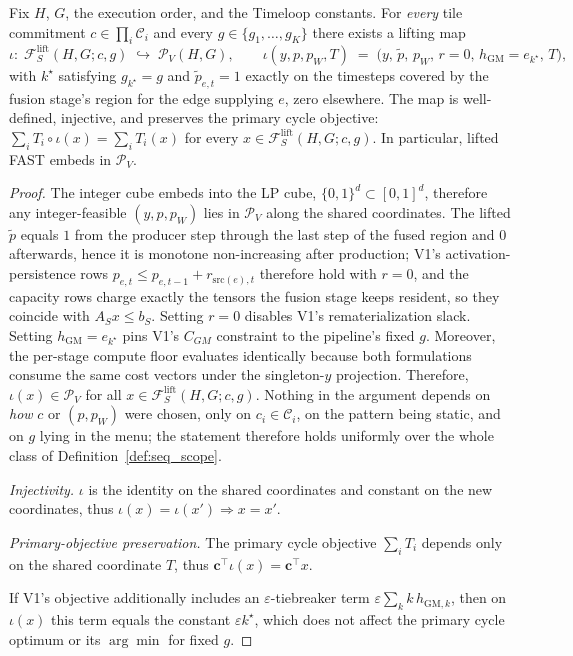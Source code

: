 \begin{theorem}
\label{thm:containment}
Fix $H$, $G$, the execution order, and the Timeloop constants. For
\emph{every} tile commitment $c \in \prod_i \mathcal{C}_i$ and every
$g \in \{g_1,\ldots,g_K\}$ there exists a lifting map
$$
\iota:\; \mathcal{F}_S^{\mathrm{lift}}(H,G;c,g) \;\hookrightarrow\; \mathcal{P}_V(H,G),\qquad
\iota(y,p,p_W,T) \;=\; \big(y,\,\tilde{p},\,p_W,\,r{=}0,\,h_{\mathrm{GM}}{=}e_{k^\star},\,T\big),
$$
with $k^\star$ satisfying $g_{k^\star}{=}g$ and $\tilde{p}_{e,t}{=}1$ exactly on
the timesteps covered by the fusion stage's region for the edge supplying $e$,
zero elsewhere. The map is well-defined, injective, and preserves the primary
cycle objective: $\sum_i T_i \circ\iota(x) = \sum_i T_i(x)$ for every
$x \in \mathcal{F}_S^{\mathrm{lift}}(H,G;c,g)$. In particular, lifted FAST
embeds in $\mathcal{P}_V$.
\end{theorem}

\begin{proof}
The integer cube embeds into the LP cube, $\{0,1\}^{d} \subset [0,1]^{d}$,
therefore any integer-feasible $(y,p,p_W)$ lies in $\mathcal{P}_V$ along the
shared coordinates.
The lifted $\tilde{p}$ equals $1$ from the producer step through the last step
of the fused region and $0$ afterwards, hence it is monotone non-increasing
after production; V1's activation-persistence rows
$p_{e,t} \le p_{e,t-1} + r_{\mathrm{src}(e),t}$ therefore hold with $r{=}0$,
and the capacity rows charge exactly the tensors the fusion stage keeps
resident, so they coincide with $A_S x \le b_S$. Setting $r{=}0$ disables V1's
rematerialization slack. Setting $h_{\mathrm{GM}}{=}e_{k^\star}$ pins V1's
$C_{GM}$ constraint to the pipeline's fixed $g$.
Moreover, the per-stage compute floor evaluates identically because both
formulations consume the same cost vectors under the singleton-$y$ projection.
Therefore, $\iota(x) \in \mathcal{P}_V$ for all
$x \in \mathcal{F}_S^{\mathrm{lift}}(H,G;c,g)$. Nothing in the argument depends
on \emph{how} $c$ or $(p,p_W)$ were chosen, only on $c_i \in \mathcal{C}_i$, on
the pattern being static, and on $g$ lying in the menu; the statement therefore
holds uniformly over the whole class of Definition~\ref{def:seq_scope}.

\emph{Injectivity.} $\iota$ is the identity on the shared coordinates and
constant on the new coordinates, thus $\iota(x){=}\iota(x') \Rightarrow x{=}x'$.

\emph{Primary-objective preservation.} The primary cycle objective
$\sum_i T_i$ depends only on the shared coordinate $T$, thus
$\mathbf{c}^\top \iota(x) = \mathbf{c}^\top x$.

If V1's objective additionally includes an $\varepsilon$-tiebreaker term
$\varepsilon\sum_k k\, h_{\mathrm{GM},k}$, then on $\iota(x)$ this term equals
the constant $\varepsilon k^\star$, which does not affect the primary cycle
optimum or its $\arg\min$ for fixed $g$.
\end{proof}

